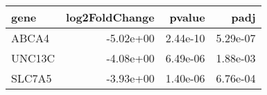 \begin{tabular}{lrrr}
\toprule
  gene &  log2FoldChange &   pvalue &     padj \\
\midrule
 ABCA4 &       -5.02e+00 & 2.44e-10 & 5.29e-07 \\
UNC13C &       -4.08e+00 & 6.49e-06 & 1.88e-03 \\
SLC7A5 &       -3.93e+00 & 1.40e-06 & 6.76e-04 \\
\bottomrule
\end{tabular}
